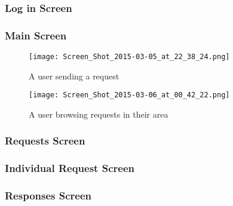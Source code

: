 \documentclass[a4paper]{article}
\begin{document}
\subsubsection{Log in Screen}

\begin{center}
\end{center}

\subsubsection{Main Screen}

\begin{center}
\end{center}

\begin{figure}[H]
\caption{A user sending a request}
\texttt{[image: Screen\_Shot\_2015-03-05\_at\_22\_38\_24.png]}
\end{figure}
\begin{figure}[H]
\caption{A user browsing requests in their area}
\texttt{[image: Screen\_Shot\_2015-03-06\_at\_00\_42\_22.png]}
\end{figure}

\subsubsection{Requests Screen}

\begin{center}
\end{center}


\subsubsection{Individual Request Screen}

\begin{center}
\end{center}

\subsubsection{Responses Screen}
\end{document}

